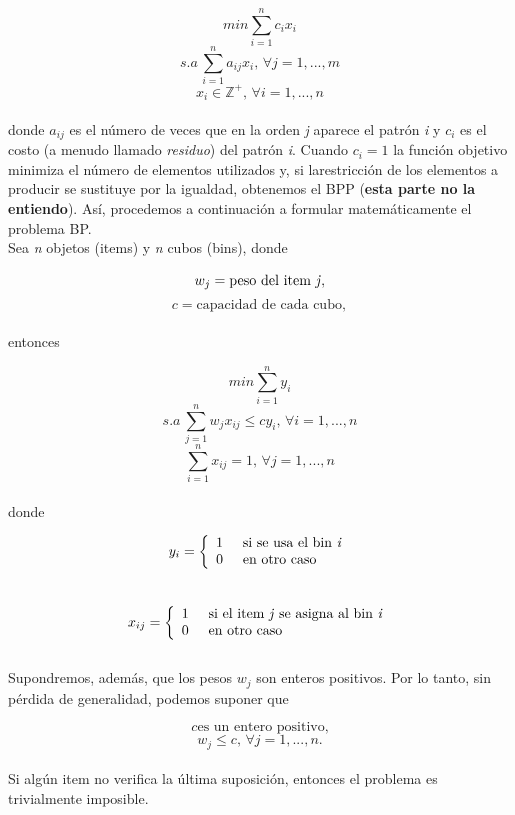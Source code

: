 \documentclass[a4paper, 12pt, oneside]{book}
\begin{document}
	$$ min \sum_{i=1}^{n}c_{i}x_{i} $$
	$$ s.a\, \sum_{i=1}^{n}a_{ij}x_{i},\, \forall j=1,...,m $$
	$$ x_{i}\in \mathbb{Z^{+}},\, \forall i=1,...,n $$
	\\
	donde $a_{ij}$ es el n\'umero de veces que en la orden \textit{j} aparece el patr\'on \textit{i} y $c_{i}$ es el costo (a menudo llamado \textit{residuo}) del patr\'on \textit{i}. Cuando $c_{i} = 1$ la funci\'on objetivo minimiza el n\'umero de elementos utilizados y, si larestricci\'on de los elementos a producir se sustituye por la igualdad, obtenemos el BPP (\textbf{esta parte no la entiendo}). As\'i, procedemos a continuaci\'on a formular matem\'aticamente el problema BP.
	\\
	
	Sea \textit{n} objetos (items) y \textit{n} cubos (bins), donde
	
	$$w_{j} = \mbox{peso del item \textit{j}},$$
	$$c = \mbox{capacidad de cada cubo},$$
	\\
	entonces 
	
	$$ min \sum_{i=1}^{n}y_{i} $$
	$$ s.a\, \sum_{j=1}^{n}w_{j}x_{ij} \leq cy_{i},\, \forall i=1,...,n $$
	$$ \sum_{i=1}^{n}x_{ij} = 1,\, \forall j=1,...,n $$
	\\
	donde
	
	\[y_{i} = \left\{\begin{array}{ll}
		1 \hspace{0.5cm} \text{si se usa el bin \textit{i}}\\
		0 \hspace{0.5cm} \text{en otro caso}
	\end{array}\right.\]
	\\
	\[x_{ij} = \left\{\begin{array}{ll}
		1 \hspace{0.5cm} \text{si el item \textit{j} se asigna al bin \textit{i}}\\
		0 \hspace{0.5cm} \text{en otro caso}
	\end{array}\right.\]
	\\
	Supondremos, adem\'as, que los pesos $w_{j}$ son enteros positivos. Por lo tanto, sin p\'erdida de generalidad, podemos suponer que
	
	$$ c \mbox{es un entero positivo,} $$
	$$ w_{j} \leq c,\, \forall j = 1,...,n. $$
	\\
	Si alg\'un item no verifica la \'ultima suposici\'on, entonces el problema es trivialmente imposible.
	\\
	
\end{document}
